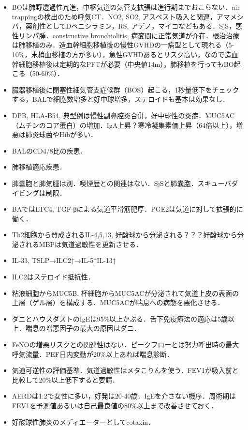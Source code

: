 \begin{itemize}
\item BOは肺野透過性亢進，中枢気道の気管支拡張は進行期までおこらない．air trappingの検出のため呼気CT．NO2, SO2, アスベスト吸入と関連，アマメシバ，薬剤性としてDペニシラミン，RS, アデノ，マイコなどもある．SjS，悪性リンパ腫．constructive bronchiolitis, 病変間に正常気道が介在．根治治療は肺移植のみ．造血幹細胞移植後の慢性GVHDの一病型として現れる（5-10\%，末梢血移植の方が多い），急性GVHDあるとリスク高い，なので造血幹細胞移植後は定期的なPFTが必要（中央値14m），肺移植を行ってもBO起こる（50-60\%）．
\item 臓器移植後に閉塞性細気管支症候群（BOS）起こる，1秒量低下をチェックする，BALで細胞数増多と好中球増多，ステロイドも基本は効果なし．

\item DPB, HLA-B54, 典型例は慢性副鼻腔炎合併，好中球性の炎症．MUC5AC（ムチンのコア蛋白）の増加．IgA上昇？寒冷凝集素価上昇（64倍以上），増悪は肺炎球菌やHibが多い．

\item BALのCD4/8比の疾患．
\item 肺移植適応疾患．
\item 肺嚢胞と肺気腫は別．喫煙歴との関連はない．SjSと肺嚢胞．スキューバダイビングは制限．

\item BAではLTC4, TGF-βによる気道平滑筋肥厚．PGE2は気道に対して拡張的に働く．
\item Th2細胞から賛成されるIL-4,5,13, 好酸球から分泌される？？？好酸球から分泌されるMBPは気道過敏性を更新させる．
\item IL-33, TSLP→ILC2↑→IL-5↑IL-13↑
\item ILC2はステロイド抵抗性．
\item 粘液細胞からMUC5B, 杯細胞からMUC5ACが分泌されて気道上皮の表面の上層（ゲル層）を構成する．MUC5ACが喘息への病態を悪化させる．
\item ダニとハウスダストのIgEは95\%以上かぶる．舌下免疫療法の適応は5歳以上．喘息の増悪因子の最大の原因はダニ．
\item FeNOの増悪リスクとの関連性はない．ピークフローとは努力呼出時の最大呼気流量．PEF日内変動が20\%以上あれば喘息診断．
\item 気道可逆性の評価基準．気道過敏性はメタこりんを使う．FEV1が吸入前と比較して20\%以上低下すると要請．

\item AERDは1:2で女性に多い，好発は20-40歳．IgEを介さない機序．周術期はFEV1を予測値あるいは自己最良値の80\%以上まで改善させておく．

\item 好酸球性肺炎のメディエーターとしてeotaxin．




\end{itemize}
